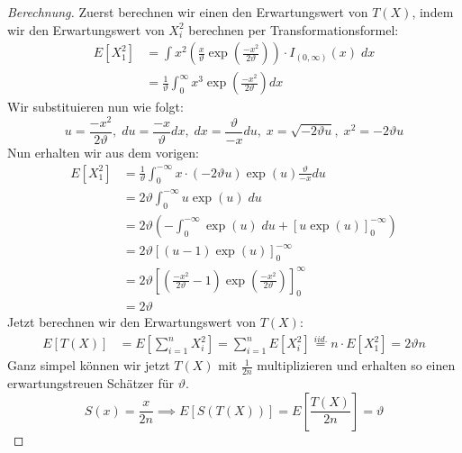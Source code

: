\documentclass[a4paper]{article}
\begin{document}
\begin{theorem}
\begin{proof}[Berechnung]
	Zuerst berechnen wir einen den Erwartungswert von $T(X)$, indem wir den Erwartungswert von
	$X_i ^2$ berechnen per Transformationsformel:
	\begin{align*}
		E \left[
			X_1 ^2
		\right] &= \int x ^2 \left(
			\frac{ x }{ \vartheta } \exp \left(
				\frac{ -x ^2 }{ 2 \vartheta }
			\right) 
		\right) \cdot I_{ ( 0, \infty ) } (x) \; dx \\
			&= \frac{ 1 }{ \vartheta } \int_{0}^{\infty} x ^3 \exp \left(
				\frac{ -x ^2 }{ 2 \vartheta }
			\right) dx
	\end{align*}
	Wir substituieren nun wie folgt:
	\[
	u = \frac{ -x ^2 }{ 2 \vartheta },\; du = \frac{ -x }{ \vartheta } dx,\;
	dx = \frac{ \vartheta }{ -x } du,\; x = \sqrt{- 2 \vartheta u},\;
	x ^2 = - 2\vartheta u
	\] 
	Nun erhalten wir aus dem vorigen:
	\begin{align*}
		E \left[
			X_1 ^2
		\right] &= \frac{ 1 }{ \vartheta }
		\int_{0}^{- \infty} x \cdot (- 2 \vartheta u) \exp (u) \frac{ \vartheta }{ -x } du \\
				&= 2 \vartheta \int_{0}^{- \infty} u \exp(u) \; du \\
				&= 2 \vartheta \left(
					- \int_{0}^{- \infty} \exp(u) \; du + \left[
						u \exp(u)
					\right]_0^{- \infty}
				\right) \\
				&= 2 \vartheta \left[
					(u - 1) \exp(u)
				\right]_0^{- \infty} \\
				&= 2 \vartheta \left[
					\left(
						\frac{ - x ^2 }{ 2 \vartheta } - 1
					\right) 
					 \exp \left(
						\frac{ -x ^2 }{ 2 \vartheta }
					\right) 
				\right]_0^{\infty} \\
				&= 2 \vartheta
	\end{align*}
	Jetzt berechnen wir den Erwartungswert von $T(X)$:
	\begin{align*}
		E \left[
			T(X)
		\right] &= E \left[
			\sum_{i=1}^{n} X_i ^2
		\right] 
		= \sum_{i=1}^{n} E \left[
			X_i ^2
		\right] \overset{iid.} = n \cdot E \left[
			X_1 ^2
		\right] = 2 \vartheta n
	\end{align*}
	Ganz simpel können wir jetzt $T(X)$ mit $\frac{ 1 }{ 2 n }$ multiplizieren und erhalten
	so einen erwartungstreuen Schätzer für $\vartheta$.
	\[
		S (x) = \frac{ x }{ 2 n } \implies E \left[
			S(T(X)) 
		\right] = E \left[
			\frac{ T(X) }{ 2 n }
		\right] = \vartheta
	\] 
\end{proof}
\end{theorem}
\end{document}
